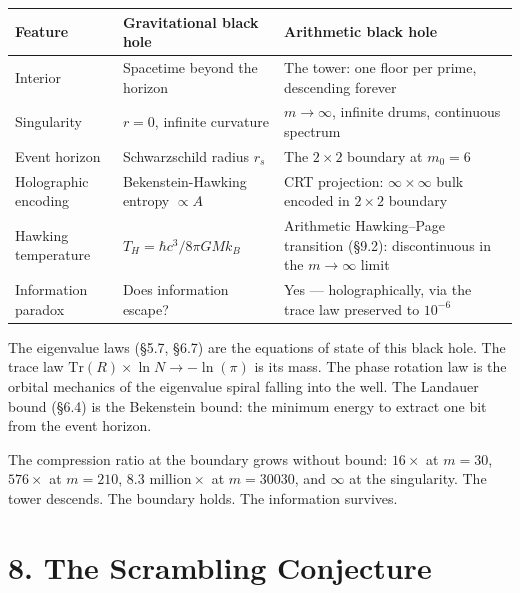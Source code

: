 \documentclass[
  11pt,
]{article}
\newcounter{none} %
\numberwithin{equation}{section}
\begin{document}
{\def\LTcaptype{none} %
\begin{longtable}[]{@{}
  >{\raggedright\arraybackslash}p{}
  >{\raggedright\arraybackslash}p{}
  >{\raggedright\arraybackslash}p{}@{}}
\toprule\noalign{}
Feature & Gravitational black hole & Arithmetic black hole \\
\midrule\noalign{}
\endhead
\bottomrule\noalign{}
\endlastfoot
Interior & Spacetime beyond the horizon & The tower: one floor per
prime, descending forever \\
Singularity & \(r = 0\), infinite curvature & \(m \to \infty\), infinite
drums, continuous spectrum \\
Event horizon & Schwarzschild radius \(r_s\) & The \(2 \times 2\)
boundary at \(m_0 = 6\) \\
Holographic encoding & Bekenstein-Hawking entropy \(\propto A\) & CRT
projection: \(\infty \times \infty\) bulk encoded in \(2 \times 2\)
boundary \\
Hawking temperature & \(T_H = \hbar c^3 / 8\pi G M k_B\) & Arithmetic
Hawking--Page transition (§9.2): discontinuous in the \(m \to \infty\)
limit \\
Information paradox & Does information escape? & Yes ---
holographically, via the trace law preserved to \(10^{-6}\) \\
\end{longtable}
}

The eigenvalue laws (§5.7, §6.7) are the equations of state of this
black hole. The trace law \(\text{Tr}(R) \times \ln N \to -\ln(\pi)\) is
its mass. The phase rotation law is the orbital mechanics of the
eigenvalue spiral falling into the well. The Landauer bound (§6.4) is
the Bekenstein bound: the minimum energy to extract one bit from the
event horizon.

The compression ratio at the boundary grows without bound: \(16\times\)
at \(m = 30\), \(576\times\) at \(m = 210\),
\(8.3\text{ million}\times\) at \(m = 30030\), and \(\infty\) at the
singularity. The tower descends. The boundary holds. The information
survives.



\setcounter{section}{8}\setcounter{equation}{0}
\setcounter{section}{8}\setcounter{equation}{0}
\section{8. The Scrambling
Conjecture}\label{the-scrambling-conjecture}
\end{document}
